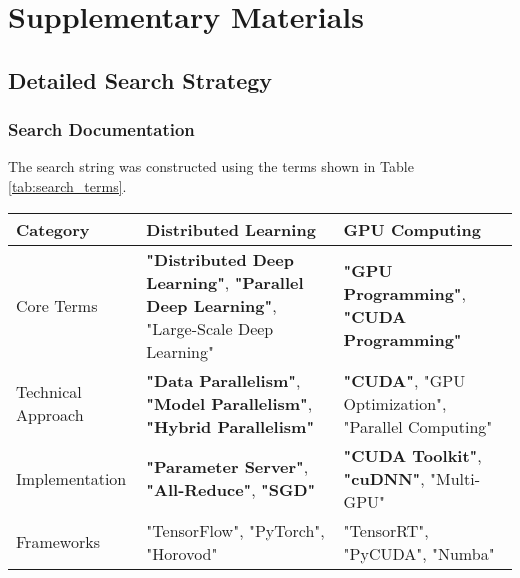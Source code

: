 \clearpage
\setcounter{page}{1}
\maketitlesupplementary

\section{Supplementary Materials}
\label{sec:supplementary}

\subsection{Detailed Search Strategy}
\label{sec:search_strategy}

\subsubsection{Search Documentation}

The search string was constructed using the terms shown in Table \ref{tab:search_terms}.
\begin{table*}[htbp!]
    \centering
    \caption{Core Search Terms for Distributed Deep Learning and GPU Programming}
    \label{tab:search_terms}
    \begin{tabularx}{\textwidth}{|l|X|X|}
        \hline
        \textbf{Category} & \textbf{Distributed Learning} & \textbf{GPU Computing} \\
        \hline
        Core Terms & 
        \textbf{"Distributed Deep Learning"},
        \textbf{"Parallel Deep Learning"},
        "Large-Scale Deep Learning" &
        \textbf{"GPU Programming"},
        \textbf{"CUDA Programming"} \\
        \hline
        Technical Approach & 
        \textbf{"Data Parallelism"},
        \textbf{"Model Parallelism"},
        \textbf{"Hybrid Parallelism"} &
        \textbf{"CUDA"},
        "GPU Optimization",
        "Parallel Computing" \\
        \hline
        Implementation & 
        \textbf{"Parameter Server"},
        \textbf{"All-Reduce"},
        \textbf{"SGD"} &
        \textbf{"CUDA Toolkit"},
        \textbf{"cuDNN"},
        "Multi-GPU" \\
        \hline
        Frameworks & 
        "TensorFlow",
        "PyTorch",
        "Horovod" &
        "TensorRT",
        "PyCUDA",
        "Numba" \\
        \hline
    \end{tabularx}
    \caption*{Note: Bold terms indicate primary search terms that will be prioritized.}
\end{table*}

